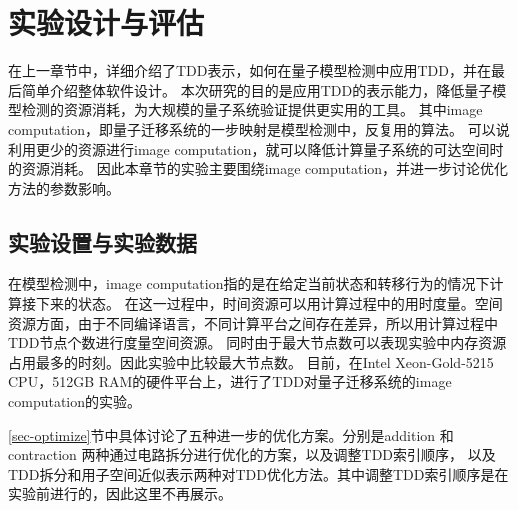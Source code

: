 \chapter{实验设计与评估}
在上一章节中，详细介绍了TDD表示，如何在量子模型检测中应用TDD，并在最后简单介绍整体软件设计。
本次研究的目的是应用TDD的表示能力，降低量子模型检测的资源消耗，为大规模的量子系统验证提供更实用的工具。
其中image computation，即量子迁移系统的一步映射是模型检测中，反复用的算法。
可以说利用更少的资源进行image computation，就可以降低计算量子系统的可达空间时的资源消耗。
因此本章节的实验主要围绕image computation，并进一步讨论优化方法的参数影响。
\section{实验设置与实验数据}
在模型检测中，image computation指的是在给定当前状态和转移行为的情况下计算接下来的状态。
在这一过程中，时间资源可以用计算过程中的用时度量。空间资源方面，由于不同编译语言，不同计算平台之间存在差异，所以用计算过程中TDD节点个数进行度量空间资源。
同时由于最大节点数可以表现实验中内存资源占用最多的时刻。因此实验中比较最大节点数。
目前，在Intel Xeon-Gold-5215 CPU，512GB RAM的硬件平台上，进行了TDD对量子迁移系统的image computation的实验。

\ref{sec-optimize}节中具体讨论了五种进一步的优化方案。分别是addition 和 contraction 两种通过电路拆分进行优化的方案，以及调整TDD索引顺序，
以及TDD拆分和用子空间近似表示两种对TDD优化方法。其中调整TDD索引顺序是在实验前进行的，因此这里不再展示。


